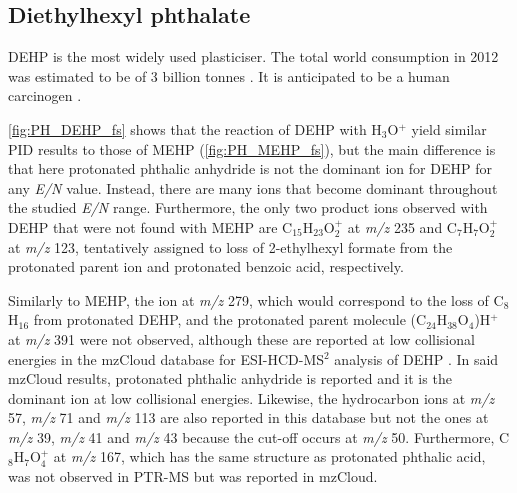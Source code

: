 

\subsection{Diethylhexyl phthalate}

DEHP is the most widely used plasticiser. The total world consumption in 2012 was estimated to be of 3 billion tonnes \cite{doi:10.1002/14356007.a20_181.pub2}.
It is anticipated to be a human carcinogen \cite{us201614th}.



\autoref{fig:PH_DEHP_fs} shows that the reaction of DEHP with H$_3$O$^+$ yield similar PID results to those of MEHP (\autoref{fig:PH_MEHP_fs}), but the main difference is that here protonated phthalic anhydride is not the dominant ion for DEHP for any \textit{E/N} value. 
%
Instead, there are many ions that become dominant throughout the studied \textit{E/N} range.
%
Furthermore, the only two product ions observed with DEHP that were not found with MEHP are  C$_{15}$H$_{23}$O$_2^+$ at \textit{m/z} 235 and C$_7$H$_{7}$O$_2^+$ at \textit{m/z} 123, tentatively assigned to loss of 2-ethylhexyl formate from the protonated parent ion  and protonated benzoic acid, respectively.

Similarly to MEHP, the ion at \textit{m/z} 279, which would correspond to the loss of C$_8$H$_{16}$ from protonated DEHP, and the protonated parent molecule (C$_{24}$H$_{38}$O$_{4}$)H$^+$ at \textit{m/z} 391
were not observed, although these are reported at low collisional energies in the mzCloud database for ESI-HCD-MS$^2$ analysis of DEHP \cite{mzcloudDEHP}.
%
In said mzCloud results, protonated phthalic anhydride is reported and it is the dominant ion at low collisional energies.
%
Likewise, the hydrocarbon ions at \textit{m/z} 57, \textit{m/z} 71 and \textit{m/z} 113 are also reported in this database but not the ones at \textit{m/z} 39, \textit{m/z} 41 and \textit{m/z} 43 because the cut-off occurs at \textit{m/z} 50.
%
Furthermore, C$_8$H$_7$O$_4^+$ at \textit{m/z} 167, which has the same structure as protonated phthalic acid,  was not observed in PTR-MS but was reported in mzCloud.






